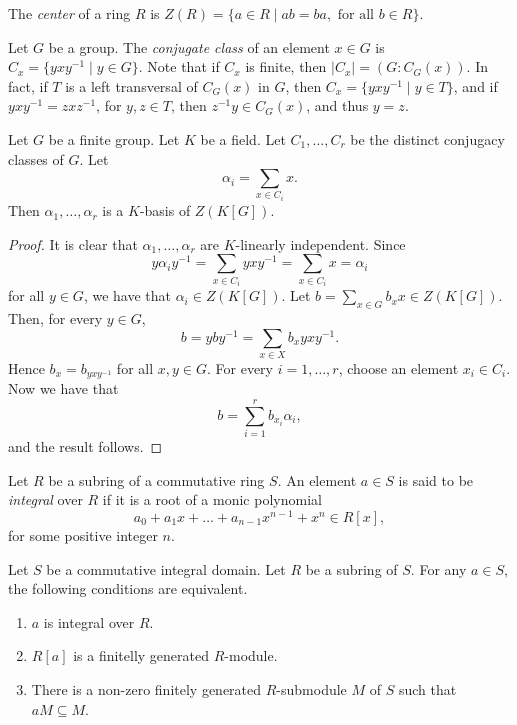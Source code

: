 The {\em center} of a ring $R$ is $Z(R)=\{ a\in R\mid ab=ba, \mbox{ for all }b\in R\}$.

Let $G$ be a group. The {\em conjugate class} of an element $x\in G$ is $C_x=\{ yxy^{-1}\mid y\in G\}$. Note that if $C_x$ is finite, then $|C_x|=(G:C_G(x))$. In fact, if $T$ is a left transversal of $C_G(x)$ in $G$, then $C_x=\{ yxy^{-1}\mid y\in T\}$, and if $yxy^{-1}=zxz^{-1}$, for $y,z\in T$, then $z^{-1}y\in C_G(x)$, and thus $y=z$. 

\begin{lemma}\label{basiscenter}
    Let $G$ be a finite group. Let $K$ be a field. Let $C_1,\dots, C_r$ be the distinct conjugacy classes of $G$. Let
    \[ \alpha_i=\sum_{x\in C_i}x.\]    
    Then $\alpha_1,\dots ,\alpha_r$ is a $K$-basis of $Z(K[G])$.
\end{lemma}

\begin{proof}
    It is clear that $\alpha_1,\dots, \alpha_r$ are $K$-linearly independent. Since
    \[ y\alpha_i y^{-1}=\sum_{x\in C_i}yxy^{-1}=\sum_{x\in C_i}x=\alpha_i\]
    for all $y\in G$, we have that $\alpha_i\in Z(K[G])$. Let $b=\sum_{x\in G}b_xx\in Z(K[G])$.
    Then, for every $y\in G$,
    \[ b=yby^{-1}=\sum_{x\in X}b_xyxy^{-1}.\]
    Hence $b_x=b_{yxy^{-1}}$ for all $x,y\in G$. For every $i=1,\dots ,r$, choose an element $x_i\in C_i$. Now we have that
    \[ b=\sum_{i=1}^rb_{x_i}\alpha_i,\]
    and the result follows.
\end{proof}

\begin{definition}
Let $R$ be a subring of a commutative ring $S$. An element $a\in S$ is said to be {\em integral} over $R$ if 
it is a root of a monic polynomial
\[ a_0+a_1x+\dots +a_{n-1}x^{n-1}+x^n\in R[x],\]
for some positive integer $n$.
\end{definition}

\begin{proposition}\label{integralelement}
Let $S$ be a commutative integral domain. Let $R$ be a subring of $S$. For any $a\in S$, the following conditions are equivalent.
\begin{enumerate}
    \item $a$ is integral over $R$.
    \item $R[a]$ is a finitelly generated $R$-module.
    \item There is a non-zero finitely generated $R$-submodule $M$ of $S$ such that $aM\subseteq M$.
\end{enumerate}
\end{proposition}

